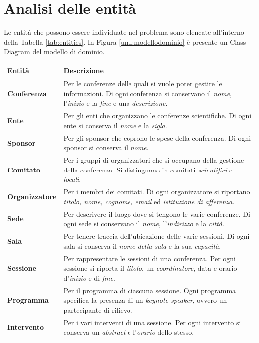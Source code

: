 \section{Analisi delle entità}
Le entità che possono essere individuate nel problema sono elencate all'interno della Tabella \ref{tab:entities}. In Figura \ref{uml:modellodominio} è presente un Class Diagram del modello di dominio.
\begin{table}[h!]
\begin{tabularx}{\textwidth}{|l|X|}
\hline
\textbf{Entità} & \textbf{Descrizione} \\
\hline
\textbf{Conferenza} & Per le conferenze delle quali si vuole poter gestire le informazioni. Di ogni conferenza si conservano il \textit{nome}, l'\textit{inizio} e la \textit{fine} e una \textit{descrizione}. \\ \hline
\textbf{Ente} & Per gli enti che organizzano le conferenze scientifiche. Di ogni ente si conserva il \textit{nome} e la \textit{sigla}. \\ \hline
\textbf{Sponsor} & Per gli sponsor che coprono le spese della conferenza. Di ogni sponsor si conserva il \textit{nome}.\\ \hline
\textbf{Comitato} & Per i gruppi di organizzatori che si occupano della gestione della conferenza. Si distinguono in comitati \textit{scientifici} e \textit{locali}. \\ \hline
\textbf{Organizzatore} & Per i membri dei comitati. Di ogni organizzatore si riportano \textit{titolo, nome, cognome, email} ed \textit{istituzione di afferenza}. \\ \hline
\textbf{Sede} & Per descrivere il luogo dove si tengono le varie conferenze. Di ogni sede si conservano il \textit{nome}, l'\textit{indirizzo} e la \textit{città}.\\ \hline
\textbf{Sala} & Per tenere traccia dell'ubicazione delle varie sessioni. Di ogni sala si conserva il \textit{nome della sala} e la sua \textit{capacità}. \\ \hline
\textbf{Sessione} & Per rappresentare le sessioni di una conferenza. Per ogni sessione si riporta il \textit{titolo}, un \textit{coordinatore}, data e orario d'\textit{inizio} e di \textit{fine}. \\ \hline
\textbf{Programma} & Per il programma di ciascuna sessione. Ogni programma specifica la presenza di un \textit{keynote speaker}, ovvero un partecipante di rilievo. \\ \hline
\textbf{Intervento} & Per i vari interventi di una sessione. Per ogni intervento si conserva un \textit{abstract} e l'\textit{orario} dello stesso. \\ \hline

\end{tabularx}
\end{table}
